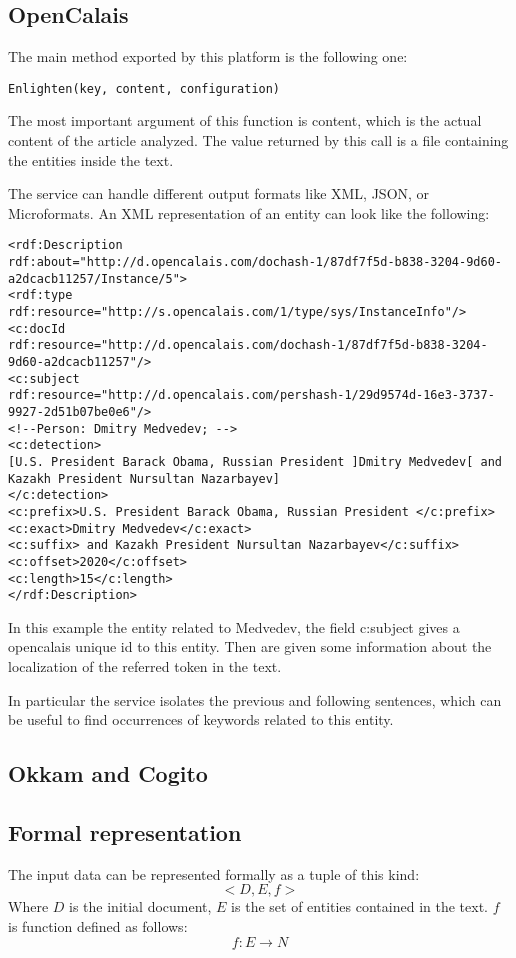 \documentclass{acm_proc_article-sp-sigmod07}
\begin{document}
\subsection{OpenCalais}
The main method exported by this platform is the following one:
\begin{verbatim}
Enlighten(key, content, configuration)
\end{verbatim}
The most important argument of this function is content, which is the
actual content of the article analyzed. The value returned by this call is
a file containing the entities inside the text.

The service can handle different output formats like XML, JSON, or
Microformats. An XML representation of an entity can look like the
following:
\begin{lstlisting}
<rdf:Description
rdf:about="http://d.opencalais.com/dochash-1/87df7f5d-b838-3204-9d60-a2dcacb11257/Instance/5">
<rdf:type rdf:resource="http://s.opencalais.com/1/type/sys/InstanceInfo"/>
<c:docId
rdf:resource="http://d.opencalais.com/dochash-1/87df7f5d-b838-3204-9d60-a2dcacb11257"/>
<c:subject
rdf:resource="http://d.opencalais.com/pershash-1/29d9574d-16e3-3737-9927-2d51b07be0e6"/>
<!--Person: Dmitry Medvedev; -->
<c:detection>
[U.S. President Barack Obama, Russian President ]Dmitry Medvedev[ and
Kazakh President Nursultan Nazarbayev]
</c:detection>
<c:prefix>U.S. President Barack Obama, Russian President </c:prefix>
<c:exact>Dmitry Medvedev</c:exact>
<c:suffix> and Kazakh President Nursultan Nazarbayev</c:suffix>
<c:offset>2020</c:offset>
<c:length>15</c:length>
</rdf:Description>
\end{lstlisting}

In this example the entity related to Medvedev, the field c:subject gives
a opencalais unique id to this entity. Then are given some information
about the localization of the referred token in the text.

In particular the service isolates the previous and following sentences,
which can be useful to find occurrences of keywords related to this
entity.

\subsection{Okkam and Cogito}

\subsection{Formal representation}
The input data can be represented formally as a tuple of this kind:
$$
<D, E, f>
$$
Where $D$ is the initial document, $E$ is the set of entities contained in
the text.
$f$ is function defined as follows:
$$
f: E \rightarrow N
$$
\end{document}
